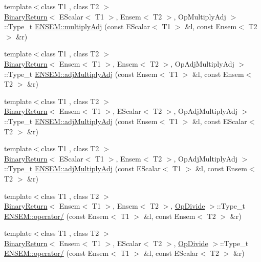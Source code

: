 \begin{DoxyCompactItemize}
\item 
{\footnotesize template$<$class T1 , class T2 $>$ }\\\mbox{\hyperlink{structBinaryReturn}{Binary\+Return}}$<$ E\+Scalar$<$ T1 $>$, Ensem$<$ T2 $>$, Op\+Multiply\+Adj $>$\+::Type\+\_\+t \mbox{\hyperlink{group__eensem_ga54febfeb3d62a5f905b336fb99d89805}{E\+N\+S\+E\+M\+::multiply\+Adj}} (const E\+Scalar$<$ T1 $>$ \&l, const Ensem$<$ T2 $>$ \&r)
\item 
{\footnotesize template$<$class T1 , class T2 $>$ }\\\mbox{\hyperlink{structBinaryReturn}{Binary\+Return}}$<$ Ensem$<$ T1 $>$, Ensem$<$ T2 $>$, Op\+Adj\+Multiply\+Adj $>$\+::Type\+\_\+t \mbox{\hyperlink{group__eensem_gaf92e62b8e69b299d4f4193702fb8dab3}{E\+N\+S\+E\+M\+::adj\+Multiply\+Adj}} (const Ensem$<$ T1 $>$ \&l, const Ensem$<$ T2 $>$ \&r)
\item 
{\footnotesize template$<$class T1 , class T2 $>$ }\\\mbox{\hyperlink{structBinaryReturn}{Binary\+Return}}$<$ Ensem$<$ T1 $>$, E\+Scalar$<$ T2 $>$, Op\+Adj\+Multiply\+Adj $>$\+::Type\+\_\+t \mbox{\hyperlink{group__eensem_gac275cf78eef2b465d5278ed910042f03}{E\+N\+S\+E\+M\+::adj\+Multiply\+Adj}} (const Ensem$<$ T1 $>$ \&l, const E\+Scalar$<$ T2 $>$ \&r)
\item 
{\footnotesize template$<$class T1 , class T2 $>$ }\\\mbox{\hyperlink{structBinaryReturn}{Binary\+Return}}$<$ E\+Scalar$<$ T1 $>$, Ensem$<$ T2 $>$, Op\+Adj\+Multiply\+Adj $>$\+::Type\+\_\+t \mbox{\hyperlink{group__eensem_ga58683063315813c7adaca604c28f954f}{E\+N\+S\+E\+M\+::adj\+Multiply\+Adj}} (const E\+Scalar$<$ T1 $>$ \&l, const Ensem$<$ T2 $>$ \&r)
\item 
{\footnotesize template$<$class T1 , class T2 $>$ }\\\mbox{\hyperlink{structBinaryReturn}{Binary\+Return}}$<$ Ensem$<$ T1 $>$, Ensem$<$ T2 $>$, \mbox{\hyperlink{structOpDivide}{Op\+Divide}} $>$\+::Type\+\_\+t \mbox{\hyperlink{group__eensem_ga4294d59488c65a0e8cb9e552578bfd86}{E\+N\+S\+E\+M\+::operator/}} (const Ensem$<$ T1 $>$ \&l, const Ensem$<$ T2 $>$ \&r)
\item 
{\footnotesize template$<$class T1 , class T2 $>$ }\\\mbox{\hyperlink{structBinaryReturn}{Binary\+Return}}$<$ Ensem$<$ T1 $>$, E\+Scalar$<$ T2 $>$, \mbox{\hyperlink{structOpDivide}{Op\+Divide}} $>$\+::Type\+\_\+t \mbox{\hyperlink{group__eensem_ga77b1f275ee5f8d89819ec03dab4ff756}{E\+N\+S\+E\+M\+::operator/}} (const Ensem$<$ T1 $>$ \&l, const E\+Scalar$<$ T2 $>$ \&r)

\end{DoxyCompactItemize}
